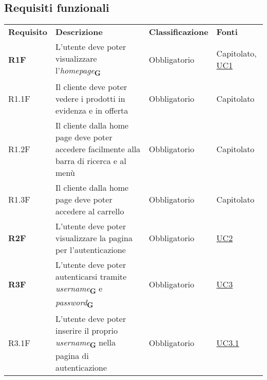 \newpage
\subsection{Requisiti funzionali}
\begin{center}
    \centering
    \renewcommand{\arraystretch}{1.8}
    \label{tab:RequisitiFunzionali}
    \begin{longtable}[!h]{p{50px} p{245px} p{75px} p{50px}}
        \rowcolor{logo!70} \textbf{Requisito} & \textbf{Descrizione}                                                                                & \textbf{Classificazione} & \textbf{Fonti}                               \\
        \textbf{R1F}                          & L'utente deve poter visualizzare l'\textit{homepage}\textsubscript{\textbf{G}}                                                         & Obbligatorio             & Capitolato, \newline \hyperref[sec:UC1]{UC1} \\
        R1.1F                                 & Il cliente deve poter vedere i prodotti in evidenza e in offerta                                    & Obbligatorio             & Capitolato                                   \\
        R1.2F                                 & Il cliente dalla home page deve poter accedere facilmente alla barra di ricerca e al menù           & Obbligatorio             & Capitolato                                   \\
        R1.3F                                 & Il cliente dalla home page deve poter accedere al carrello                                          & Obbligatorio             & Capitolato                                   \\
        \textbf{R2F}                          & L'utente deve poter visualizzare la pagina per l'autenticazione                                     & Obbligatorio             & \hyperref[sec:UC2]{UC2}                      \\
        \textbf{R3F}                          & L'utente deve poter autenticarsi tramite \textit{username}\textsubscript{\textbf{G}} e \textit{password}\textsubscript{\textbf{G}}                                        & Obbligatorio             & \hyperref[sec:UC3]{UC3}                      \\
        R3.1F                                 & L'utente deve poter inserire il proprio \textit{username}\textsubscript{\textbf{G}} nella pagina di autenticazione                     & Obbligatorio             & \hyperref[sec:UC3.1]{UC3.1}                  \\

\end{longtable}
\end{center}
